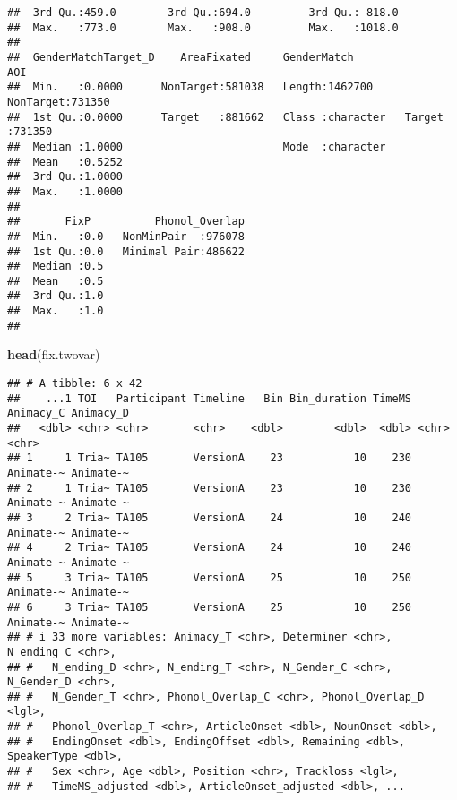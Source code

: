 \documentclass[
]{article}
\newenvironment{Shaded}{\begin{snugshade}}{\end{snugshade}}
\newcommand{\FunctionTok}[1]{\textcolor[rgb]{0.13,0.29,0.53}{\textbf{#1}}}
\newcommand{\NormalTok}[1]{#1}
\begin{document}
\begin{verbatim}
##  3rd Qu.:459.0        3rd Qu.:694.0         3rd Qu.: 818.0    
##  Max.   :773.0        Max.   :908.0         Max.   :1018.0    
##                                                               
##  GenderMatchTarget_D    AreaFixated     GenderMatch               AOI        
##  Min.   :0.0000      NonTarget:581038   Length:1462700     NonTarget:731350  
##  1st Qu.:0.0000      Target   :881662   Class :character   Target   :731350  
##  Median :1.0000                         Mode  :character                     
##  Mean   :0.5252                                                              
##  3rd Qu.:1.0000                                                              
##  Max.   :1.0000                                                              
##                                                                              
##       FixP          Phonol_Overlap  
##  Min.   :0.0   NonMinPair  :976078  
##  1st Qu.:0.0   Minimal Pair:486622  
##  Median :0.5                        
##  Mean   :0.5                        
##  3rd Qu.:1.0                        
##  Max.   :1.0                        
## 
\end{verbatim}

\begin{Shaded}
\begin{Highlighting}[]
\FunctionTok{head}\NormalTok{(fix.twovar)}
\end{Highlighting}
\end{Shaded}

\begin{verbatim}
## # A tibble: 6 x 42
##    ...1 TOI   Participant Timeline   Bin Bin_duration TimeMS Animacy_C Animacy_D
##   <dbl> <chr> <chr>       <chr>    <dbl>        <dbl>  <dbl> <chr>     <chr>    
## 1     1 Tria~ TA105       VersionA    23           10    230 Animate-~ Animate-~
## 2     1 Tria~ TA105       VersionA    23           10    230 Animate-~ Animate-~
## 3     2 Tria~ TA105       VersionA    24           10    240 Animate-~ Animate-~
## 4     2 Tria~ TA105       VersionA    24           10    240 Animate-~ Animate-~
## 5     3 Tria~ TA105       VersionA    25           10    250 Animate-~ Animate-~
## 6     3 Tria~ TA105       VersionA    25           10    250 Animate-~ Animate-~
## # i 33 more variables: Animacy_T <chr>, Determiner <chr>, N_ending_C <chr>,
## #   N_ending_D <chr>, N_ending_T <chr>, N_Gender_C <chr>, N_Gender_D <chr>,
## #   N_Gender_T <chr>, Phonol_Overlap_C <chr>, Phonol_Overlap_D <lgl>,
## #   Phonol_Overlap_T <chr>, ArticleOnset <dbl>, NounOnset <dbl>,
## #   EndingOnset <dbl>, EndingOffset <dbl>, Remaining <dbl>, SpeakerType <dbl>,
## #   Sex <chr>, Age <dbl>, Position <chr>, Trackloss <lgl>,
## #   TimeMS_adjusted <dbl>, ArticleOnset_adjusted <dbl>, ...
\end{verbatim}
\end{document}
